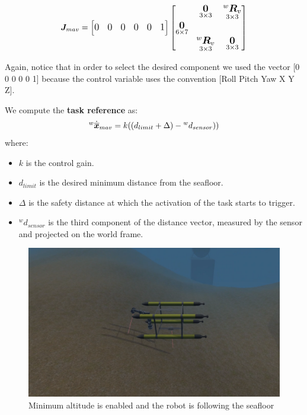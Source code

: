\documentclass{article}
\begin{document}
\begin{equation}
\large
\boldsymbol{J}_{mav}=\begin{bmatrix} 0 & 0 & 0 & 0 & 0 & 1
\end{bmatrix}
    \begin{bmatrix}
     & \underset{3\times 3}{\boldsymbol{0}} & \underset{ 3\times 3}{^{w}\boldsymbol{R}_{v}} \\
     \underset{ 6\times 7}{\boldsymbol{0}} \\
     & \underset{ 3\times 3}{^{w}\boldsymbol{R}_{v}} & \underset{3\times 3}{\boldsymbol{0}} \\
    \end{bmatrix}
\end{equation}

Again, notice that in order to select the desired component we used the vector [0 0 0 0 0 1] because the control variable uses the convention [Roll Pitch Yaw X Y Z].

\noindent
\vspace{5px}
We compute the \textbf{task reference} as: 
\begin{equation}
\large
    ^{w}\dot{\overline{\boldsymbol{x}}}_{mav} = k((d_{limit}+\Delta)- {^w}d_{sensor})) %
\end{equation}
where:
\begin{itemize}
    \item $k$ is the control gain.
    \item $d_{limit}$ is the desired minimum distance from the seafloor.
    \item $ \Delta $ is the safety distance at which the activation of the task starts to trigger.
    \item $^w d_{sensor}$ is the third component  of the distance vector, measured by the sensor and projected on the world frame.
\end{itemize} 

\begin{figure}[t]
    \centering
    \includegraphics[scale=0.4]{122_MAV1m.png}
    \caption{Minimum altitude is enabled and the robot is following the seafloor}
    \label{images_2_1}
\end{figure}
\end{document}
